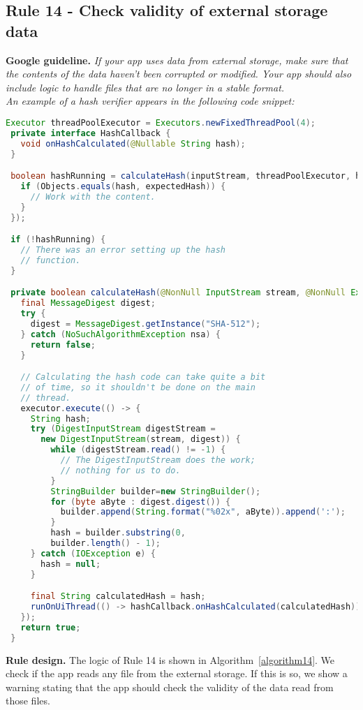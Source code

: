 \subsection{Rule 14 - Check validity of external storage data} 
\textbf{Google guideline.} \emph{If your app uses data from external storage, make sure that the contents of the data haven't been corrupted or modified. Your app should also include logic to handle files that are no longer in a stable format.
\\
An example of a hash verifier appears in the following code snippet:}
\begin{lstlisting}[language=Java, caption=Check validity of data, numbers=none]
 Executor threadPoolExecutor = Executors.newFixedThreadPool(4);
 private interface HashCallback {
   void onHashCalculated(@Nullable String hash);
 }

 boolean hashRunning = calculateHash(inputStream, threadPoolExecutor, hash -> {
   if (Objects.equals(hash, expectedHash)) {
     // Work with the content.
   }
 });

 if (!hashRunning) {
   // There was an error setting up the hash
   // function.
 }

 private boolean calculateHash(@NonNull InputStream stream, @NonNull Executor executor, @NonNull HashCallback hashCallback) {
   final MessageDigest digest;
   try {
     digest = MessageDigest.getInstance("SHA-512");
   } catch (NoSuchAlgorithmException nsa) {
     return false;
   }

   // Calculating the hash code can take quite a bit
   // of time, so it shouldn't be done on the main
   // thread.
   executor.execute(() -> {
     String hash;
     try (DigestInputStream digestStream =
       new DigestInputStream(stream, digest)) {
         while (digestStream.read() != -1) {
           // The DigestInputStream does the work;
           // nothing for us to do.
         }
         StringBuilder builder=new StringBuilder();
         for (byte aByte : digest.digest()) {
           builder.append(String.format("%02x", aByte)).append(':');
         }
         hash = builder.substring(0,
         builder.length() - 1);
     } catch (IOException e) {
       hash = null;
     }

     final String calculatedHash = hash;
     runOnUiThread(() -> hashCallback.onHashCalculated(calculatedHash));
   });
   return true;
 }

\end{lstlisting}

\textbf{Rule design.} The logic of Rule 14 is shown in Algorithm~\ref{algorithm14}. We check if the app reads any file from the external storage. If this is so, we show a warning stating that the app should check the validity of the data read from those files. 

